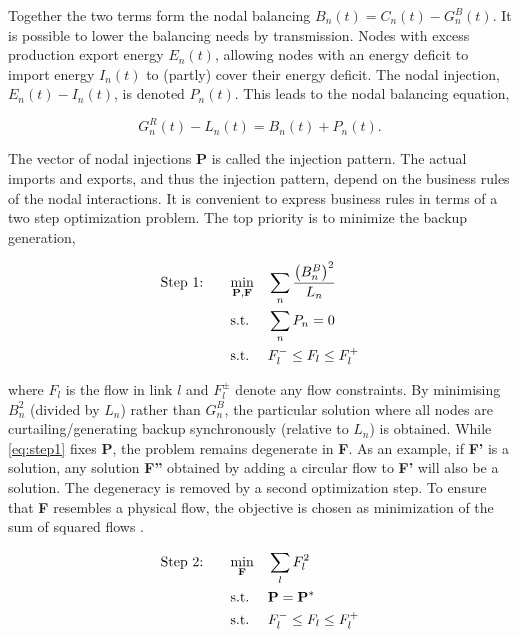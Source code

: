 \documentclass[a4paper, 5p, sort&compress]{elsarticle}%
\newcommand{\paren}[1]{\left(#1\right)}
\begin{document}
Together the two terms form the nodal balancing
$B_{n}(t) = C_{n}(t) - G^{B}_{n}(t)$.  It is possible to lower the
balancing needs by transmission. Nodes with excess production export
energy $E_{n}(t)$, allowing nodes with an energy deficit to import
energy $I_{n}(t)$ to (partly) cover their energy deficit. The nodal
injection, $E_{n}(t) - I_{n}(t)$, is denoted $P_{n}(t)$. This leads to
the nodal balancing equation,

\begin{equation}
  \label{eq:nodal-balancing}
  G^{R}_{n}(t) - L_{n}(t) = B_{n}(t) + P_{n}(t) .
\end{equation}

The vector of nodal injections $\mathbf{P}$ is called the injection
pattern. The actual imports and exports, and thus the injection
pattern, depend on the business rules of the nodal interactions. It is
convenient to express business rules in terms of a two step
optimization problem. The top priority is to minimize the backup
generation,

\begin{equation}
  \label{eq:step1}
  \begin{aligned}
    \text{Step 1: \hspace{15pt}}& \underset{\mathbf{P}, \mathbf{F}}{\text{min}}
    & & \sum_{n} \frac{\paren{B_{n}^{B}}^{2}}{L_{n}} \\
    & \text{s.t.}
    & & \sum_{n} P_{n} = 0 \\ %
    & \text{s.t.}
    & & F_{l}^{-} \leq F_{l} \leq F_{l}^{+}
  \end{aligned}
\end{equation}

where $F_{l}$ is the flow in link $l$ and $F_{l}^{\pm}$ denote any
flow constraints. By minimising $B_{n}^{2}$ (divided by $L_{n}$)
rather than $G_{n}^{B}$, the particular solution where all nodes are
curtailing/generating backup synchronously (relative to $L_{n}$) is
obtained. While \cref{eq:step1} fixes \textbf{P}, the problem remains
degenerate in \textbf{F}. As an example, if \textbf{F'} is a solution,
any solution \textbf{F''} obtained by adding a circular flow to
\textbf{F'} will also be a solution. The degeneracy is removed by a
second optimization step. To ensure that \textbf{F} resembles a
physical flow, the objective is chosen as minimization of the sum of
squared flows \cite{Magnus}.

\begin{equation}
  \begin{aligned}
    \label{eq:step2}
    \text{Step 2: \hspace{15pt}} & \underset{\mathbf{F}}{\text{min}}
    & & \sum_{l} F_{l}^{2} \\
    & \text{s.t.}
    & & \mathbf{P} = \mathbf{P}^{*} \\ %
    & \text{s.t.}
    & & F_{l}^{-} \leq F_{l} \leq F_{l}^{+} \\
  \end{aligned}
\end{equation}
\end{document}
